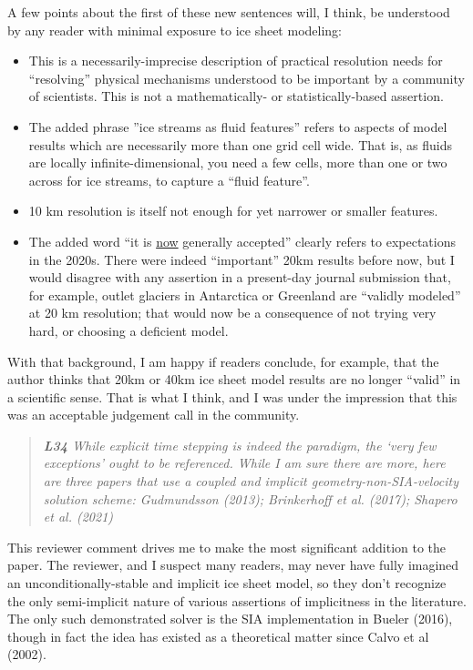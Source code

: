 \documentclass[letterpaper,final,12pt,reqno]{amsart}
\newenvironment{review}%
{\bigskip \par \begin{quote} \selectfont \sl}%
{\end{quote}}
\begin{document}
\noindent A few points about the first of these new sentences will, I think, be understood by any reader with minimal exposure to ice sheet modeling:
\begin{itemize}
\item This is a necessarily-imprecise description of practical resolution needs for ``resolving'' physical mechanisms understood to be important by a community of scientists.  This is not a mathematically- or statistically-based assertion.
\item The added phrase ''ice streams as fluid features'' refers to aspects of model results which are necessarily more than one grid cell wide.  That is, as fluids are locally infinite-dimensional, you need a few cells, more than one or two across for ice streams, to capture a ``fluid feature''.
\item 10 km resolution is itself not enough for yet narrower or smaller features.
\item The added word ``it is \underline{now} generally accepted'' clearly refers to expectations in the 2020s.  There were indeed ``important'' 20km results before now, but I would disagree with any assertion in a present-day journal submission that, for example, outlet glaciers in Antarctica or Greenland are ``validly modeled'' at 20 km resolution; that would now be a consequence of not trying very hard, or choosing a deficient model.
\end{itemize}
With that background, I am happy if readers conclude, for example, that the author thinks that 20km or 40km ice sheet model results are no longer ``valid'' in a scientific sense.  That is what I think, and I was under the impression that this was an acceptable judgement call in the community.

\begin{review}
\textbf{L34}  While explicit time stepping is indeed the paradigm, the ‘very few exceptions’ ought to be referenced.  While I am sure there are more, here are three papers that use a coupled and implicit geometry-non-SIA-velocity solution scheme: Gudmundsson (2013); Brinkerhoff et al. (2017); Shapero et al. (2021)
\end{review}

\noindent This reviewer comment drives me to make the most significant addition to the paper.  The reviewer, and I suspect many readers, may never have fully imagined an unconditionally-stable and implicit ice sheet model, so they don't recognize the only semi-implicit nature of various assertions of implicitness in the literature.  The only such demonstrated solver is the SIA implementation in Bueler (2016), though in fact the idea has existed as a theoretical matter since Calvo et al (2002).
\end{document}
